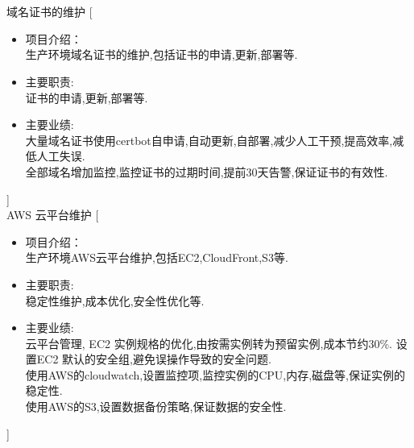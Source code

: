 \documentclass[zh]{resume}
\begin{document}
\begin{experiences}
  \\
  \\
  {域名证书的维护}%
  [\begin{itemize}
    \item 项目介绍：\\
    生产环境域名证书的维护,包括证书的申请,更新,部署等.
    \item 主要职责: \\
    证书的申请,更新,部署等.
    \item 主要业绩: \\
   大量域名证书使用certbot自申请,自动更新,自部署,减少人工干预,提高效率,减低人工失误. \\
   全部域名增加监控,监控证书的过期时间,提前30天告警,保证证书的有效性.
  \end{itemize}]
  \\
  {AWS 云平台维护}%
  [\begin{itemize}
    \item 项目介绍：\\
    生产环境AWS云平台维护,包括EC2,CloudFront,S3等.
    \item 主要职责: \\
    稳定性维护,成本优化,安全性优化等.
    \item 主要业绩: \\
    云平台管理, EC2 实例规格的优化,由按需实例转为预留实例,成本节约30\%. 设置EC2 默认的安全组,避免误操作导致的安全问题. \\
    使用AWS的cloudwatch,设置监控项,监控实例的CPU,内存,磁盘等,保证实例的稳定性. \\
    使用AWS的S3,设置数据备份策略,保证数据的安全性.
  \end{itemize}]
  \\
\end{experiences}
\end{document}
